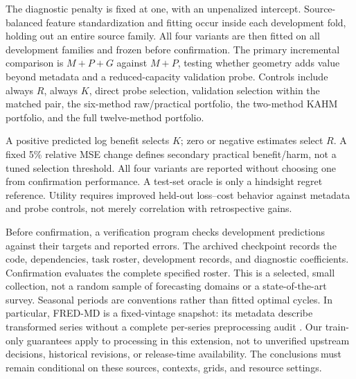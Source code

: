 The diagnostic penalty is fixed at one, with an unpenalized intercept.
Source-balanced feature standardization and fitting occur inside each
development fold, holding out an entire source family.  All four variants are
then fitted on all development families and frozen before confirmation.
The primary incremental comparison is $M+P+G$ against $M+P$, testing whether
geometry adds value beyond metadata and a reduced-capacity validation probe.
Controls include always $R$, always $K$, direct probe selection, validation
selection within the matched pair, the six-method raw/practical portfolio,
the two-method KAHM portfolio, and the full twelve-method portfolio.

A positive predicted log benefit selects $K$; zero or negative estimates
select $R$.  A fixed 5\%
relative MSE change defines secondary practical benefit/harm, not a tuned
selection threshold.  All four variants are reported without choosing one from
confirmation performance.  A test-set oracle is only a hindsight regret
reference.  Utility requires improved held-out loss--cost behavior against
metadata and probe controls, not merely correlation with retrospective gains.

Before confirmation, a verification program checks development predictions
against their targets and reported errors. The archived checkpoint records
the code, dependencies, task roster, development records, and diagnostic
coefficients. Confirmation evaluates the complete specified roster.
This is a selected, small collection, not a random sample of forecasting
domains or a state-of-the-art survey.  Seasonal periods are conventions rather
than fitted optimal cycles.  In particular, FRED-MD is a fixed-vintage
snapshot: its metadata describe transformed series without a complete
per-series preprocessing audit \citep{DatasetFREDMD}.  Our train-only guarantees
apply to processing in this extension, not to unverified upstream decisions,
historical revisions, or release-time availability.  The conclusions must
remain conditional on these sources, contexts, grids, and resource settings.
